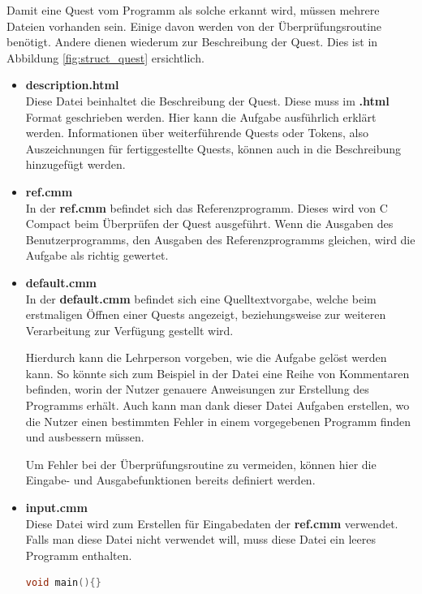 Damit eine Quest vom Programm als solche erkannt wird, müssen mehrere Dateien vorhanden sein. Einige davon werden von der Überprüfungsroutine benötigt. Andere dienen wiederum zur Beschreibung der Quest. Dies ist in Abbildung \ref{fig:struct_quest} ersichtlich.

\begin{itemize}
\item \textbf{description.html}\\
Diese Datei beinhaltet die Beschreibung der Quest. Diese muss im \textbf{.html} Format geschrieben werden. Hier kann die Aufgabe ausführlich erklärt werden. Informationen über weiterführende Quests oder Tokens, also Auszeichnungen für fertiggestellte Quests, können auch in die Beschreibung hinzugefügt werden.

\item \textbf{ref.cmm}\\
In der \textbf{ref.cmm} befindet sich das Referenzprogramm. Dieses wird von C Compact beim Überprüfen der Quest ausgeführt. Wenn die Ausgaben des Benutzerprogramms, den Ausgaben des Referenzprogramms gleichen, wird die Aufgabe als richtig gewertet.

\item \textbf{default.cmm}\\
In der \textbf{default.cmm} befindet sich eine Quelltextvorgabe, welche beim erstmaligen Öffnen einer Quests angezeigt, beziehungsweise zur weiteren Verarbeitung zur Verfügung gestellt wird. 

Hierdurch kann die Lehrperson vorgeben, wie die Aufgabe gelöst werden kann. So könnte sich zum Beispiel in der Datei eine Reihe von Kommentaren befinden, worin der Nutzer genauere Anweisungen zur Erstellung des Programms erhält. Auch kann man dank dieser Datei Aufgaben erstellen, wo die Nutzer einen bestimmten Fehler in einem vorgegebenen Programm finden und ausbessern müssen. 

Um Fehler bei der Überprüfungsroutine zu vermeiden, können hier die Eingabe- und Ausgabefunktionen bereits definiert werden. 

\item \textbf{input.cmm}\\
Diese Datei wird zum Erstellen für Eingabedaten der \textbf{ref.cmm} verwendet. Falls man diese Datei nicht verwendet will, muss diese Datei ein leeres Programm enthalten. 
\begin{lstlisting}[language=C]
void main(){}
\end{lstlisting}
\end{itemize}

